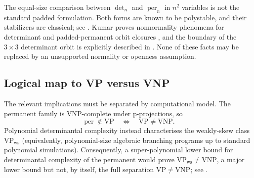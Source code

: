 \documentclass[11pt]{article}
\theoremstyle{definition}
\theoremstyle{remark}
\DeclareMathOperator{\per}{per}
\begin{document}
The equal-size comparison between $\det_n$ and $\per_n$ in $n^2$ variables is
not the standard padded formulation.  Both forms are known to be polystable,
and their stabilizers are classical; see \cite{BI2017}.  Kumar proves
nonnormality phenomena for determinant and padded-permanent orbit closures
\cite{Kumar2013}, and the boundary of the $3\times3$ determinant orbit is
explicitly described in \cite{HuttenhainLairez2016}.  None of these facts may
be replaced by an unsupported normality or openness assumption.

\subsection{Logical map to VP versus VNP}

The relevant implications must be separated by computational model.  The
permanent family is VNP-complete under p-projections, so
\[
 \per\notin\mathrm{VP}\quad\Longleftrightarrow\quad
 \mathrm{VP}\ne\mathrm{VNP}.
\]
Polynomial determinantal complexity instead characterises the weakly-skew
class $\mathrm{VP}_{\mathrm{ws}}$ (equivalently, polynomial-size algebraic
branching programs up to standard polynomial simulations).  Consequently, a
super-polynomial lower bound for determinantal complexity of the permanent
would prove
$\mathrm{VP}_{\mathrm{ws}}\ne\mathrm{VNP}$, a major lower bound but not, by
itself, the full separation $\mathrm{VP}\ne\mathrm{VNP}$; see
\cite{BlaserIkenmeyer2025}.
\end{document}
